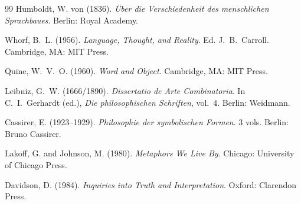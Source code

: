 \documentclass[11pt, oneside]{article}
\theoremstyle{definition}
\begin{document}
\begin{thebibliography}{99}
 Humboldt, W. von (1836). \textit{\"{U}ber die Verschiedenheit des menschlichen Sprachbaues}. Berlin: Royal Academy.

 Whorf, B.~L. (1956). \textit{Language, Thought, and Reality}. Ed. J.~B.~Carroll. Cambridge, MA: MIT Press.

 Quine, W.~V.~O. (1960). \textit{Word and Object}. Cambridge, MA: MIT Press.

 Leibniz, G.~W. (1666/1890). \textit{Dissertatio de Arte Combinatoria}. In C.~I.~Gerhardt (ed.), \textit{Die philosophischen Schriften}, vol.~4. Berlin: Weidmann.

 Cassirer, E. (1923--1929). \textit{Philosophie der symbolischen Formen}. 3 vols. Berlin: Bruno Cassirer.

 Lakoff, G. and Johnson, M. (1980). \textit{Metaphors We Live By}. Chicago: University of Chicago Press.

 Davidson, D. (1984). \textit{Inquiries into Truth and Interpretation}. Oxford: Clarendon Press.

\end{thebibliography}
\end{document}
